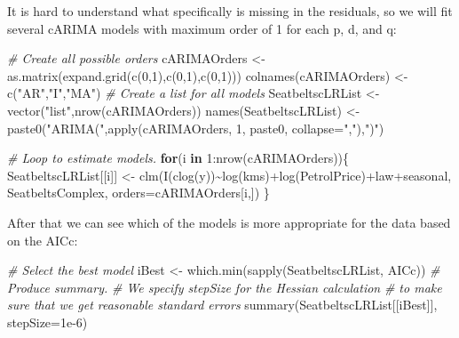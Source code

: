 \documentclass[
]{book}
\newenvironment{Shaded}{\begin{snugshade}}{\end{snugshade}}
\newcommand{\AttributeTok}[1]{\textcolor[rgb]{0.77,0.63,0.00}{#1}}
\newcommand{\CommentTok}[1]{\textcolor[rgb]{0.56,0.35,0.01}{\textit{#1}}}
\newcommand{\ControlFlowTok}[1]{\textcolor[rgb]{0.13,0.29,0.53}{\textbf{#1}}}
\newcommand{\DecValTok}[1]{\textcolor[rgb]{0.00,0.00,0.81}{#1}}
\newcommand{\FloatTok}[1]{\textcolor[rgb]{0.00,0.00,0.81}{#1}}
\newcommand{\FunctionTok}[1]{\textcolor[rgb]{0.00,0.00,0.00}{#1}}
\newcommand{\NormalTok}[1]{#1}
\newcommand{\OtherTok}[1]{\textcolor[rgb]{0.56,0.35,0.01}{#1}}
\newcommand{\SpecialCharTok}[1]{\textcolor[rgb]{0.00,0.00,0.00}{#1}}
\newcommand{\StringTok}[1]{\textcolor[rgb]{0.31,0.60,0.02}{#1}}
\begin{document}
It is hard to understand what specifically is missing in the residuals, so we will fit several cARIMA models with maximum order of 1 for each p, d, and q:

\begin{Shaded}
\begin{Highlighting}[]
\CommentTok{\# Create all possible orders}
\NormalTok{cARIMAOrders }\OtherTok{\textless{}{-}} \FunctionTok{as.matrix}\NormalTok{(}\FunctionTok{expand.grid}\NormalTok{(}\FunctionTok{c}\NormalTok{(}\DecValTok{0}\NormalTok{,}\DecValTok{1}\NormalTok{),}\FunctionTok{c}\NormalTok{(}\DecValTok{0}\NormalTok{,}\DecValTok{1}\NormalTok{),}\FunctionTok{c}\NormalTok{(}\DecValTok{0}\NormalTok{,}\DecValTok{1}\NormalTok{)))}
\FunctionTok{colnames}\NormalTok{(cARIMAOrders) }\OtherTok{\textless{}{-}} \FunctionTok{c}\NormalTok{(}\StringTok{"AR"}\NormalTok{,}\StringTok{"I"}\NormalTok{,}\StringTok{"MA"}\NormalTok{)}
\CommentTok{\# Create a list for all models}
\NormalTok{SeatbeltscLRList }\OtherTok{\textless{}{-}} \FunctionTok{vector}\NormalTok{(}\StringTok{"list"}\NormalTok{,}\FunctionTok{nrow}\NormalTok{(cARIMAOrders))}
\FunctionTok{names}\NormalTok{(SeatbeltscLRList) }\OtherTok{\textless{}{-}}
    \FunctionTok{paste0}\NormalTok{(}\StringTok{"ARIMA("}\NormalTok{,}\FunctionTok{apply}\NormalTok{(cARIMAOrders, }\DecValTok{1}\NormalTok{,}
\NormalTok{                          paste0, }\AttributeTok{collapse=}\StringTok{","}\NormalTok{),}\StringTok{")"}\NormalTok{)}

\CommentTok{\# Loop to estimate models.}
\ControlFlowTok{for}\NormalTok{(i }\ControlFlowTok{in} \DecValTok{1}\SpecialCharTok{:}\FunctionTok{nrow}\NormalTok{(cARIMAOrders))\{}
\NormalTok{    SeatbeltscLRList[[i]] }\OtherTok{\textless{}{-}}
        \FunctionTok{clm}\NormalTok{(}\FunctionTok{I}\NormalTok{(}\FunctionTok{clog}\NormalTok{(y))}\SpecialCharTok{\textasciitilde{}}\FunctionTok{log}\NormalTok{(kms)}\SpecialCharTok{+}\FunctionTok{log}\NormalTok{(PetrolPrice)}\SpecialCharTok{+}\NormalTok{law}\SpecialCharTok{+}\NormalTok{seasonal,}
\NormalTok{            SeatbeltsComplex, }\AttributeTok{orders=}\NormalTok{cARIMAOrders[i,])}
\NormalTok{\}}
\end{Highlighting}
\end{Shaded}

After that we can see which of the models is more appropriate for the data based on the AICc:

\begin{Shaded}
\begin{Highlighting}[]
\CommentTok{\# Select the best model}
\NormalTok{iBest }\OtherTok{\textless{}{-}} \FunctionTok{which.min}\NormalTok{(}\FunctionTok{sapply}\NormalTok{(SeatbeltscLRList, AICc))}
\CommentTok{\# Produce summary.}
\CommentTok{\# We specify stepSize for the Hessian calculation}
\CommentTok{\# to make sure that we get reasonable standard errors}
\FunctionTok{summary}\NormalTok{(SeatbeltscLRList[[iBest]], }\AttributeTok{stepSize=}\FloatTok{1e{-}6}\NormalTok{)}
\end{Highlighting}
\end{Shaded}
\end{document}
